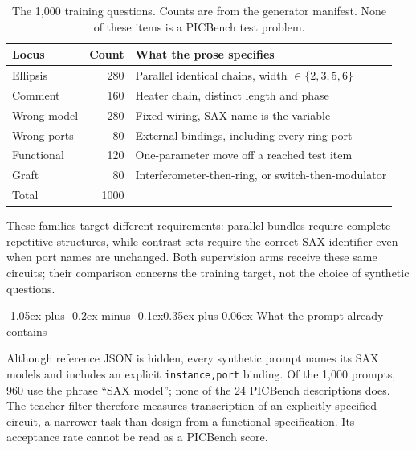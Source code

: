 \documentclass[11pt]{article}
\makeatletter
\renewcommand\subsection{\@startsection{subsection}{2}{\z@}%
  {-1.05ex plus -0.2ex minus -0.1ex}{0.35ex plus 0.06ex}%
  {\normalfont\normalsize\bfseries}}
\makeatother
\begin{document}
\begin{table}[H]
\caption{The 1{,}000 training questions.
Counts are from the generator manifest.
None of these items is a PICBench test problem.}
\label{tab:train}
\begin{center}
\begin{small}
\begin{tabular}{lrl}
\toprule
Locus & Count & What the prose specifies \\
\midrule
Ellipsis & 280 & Parallel identical chains, width $\in \{2,3,5,6\}$ \\
Comment & 160 & Heater chain, distinct length and phase \\
Wrong model & 280 & Fixed wiring, SAX name is the variable \\
Wrong ports & 80 & External bindings, including every ring port \\
Functional & 120 & One-parameter move off a reached test item \\
Graft & 80 & Interferometer-then-ring, or switch-then-modulator \\
\midrule
Total & 1000 & \\
\bottomrule
\end{tabular}
\end{small}
\end{center}
\end{table}

These families target different requirements: parallel bundles require complete repetitive structures, while contrast sets require the correct SAX identifier even when port names are unchanged. Both supervision arms receive these same circuits; their comparison concerns the training target, not the choice of synthetic questions.

\subsection{What the prompt already contains}
\label{sec:exposure}

Although reference JSON is hidden, every synthetic prompt names its SAX models and includes an explicit \texttt{instance,port} binding. Of the 1{,}000 prompts, 960 use the phrase ``SAX model''; none of the 24 PICBench descriptions does. The teacher filter therefore measures transcription of an explicitly specified circuit, a narrower task than design from a functional specification. Its acceptance rate cannot be read as a PICBench score.
\end{document}
